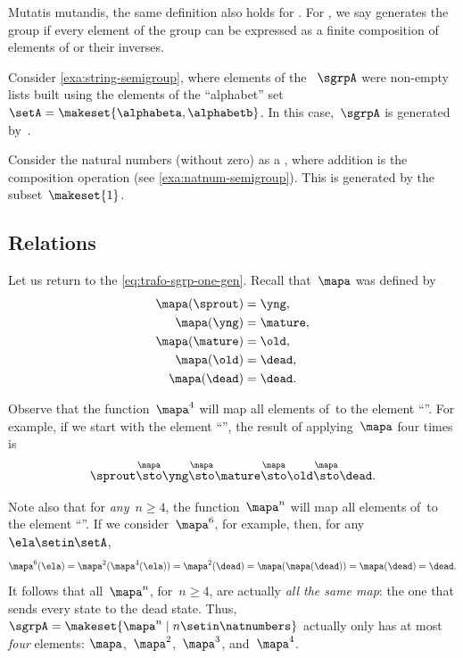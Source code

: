 \begin{remark}
    Mutatis mutandis, the same definition also holds for .
    For , we say \setA generates the group if every element of the group can be expressed as a finite composition of elements of \setA or their inverses.
\end{remark}

\begin{example}
    Consider \cref{exa:string-semigroup}, where elements of the ~$\sgrpA$ were non-empty lists built using the elements of the ``alphabet'' set~$\setA = \makeset{ \alphabeta, \alphabetb}$.
    In this case,~$\sgrpA$ is generated by~\setA.
\end{example}

\begin{example}
    Consider the natural numbers (without zero) as a , where addition is the  composition operation (see \cref{exa:natnum-semigroup}).
    This  is generated by the subset~$\makeset{1 }$.
\end{example}

\subsection{Relations}

Let us return to the  \cref{eq:trafo-sgrp-one-gen}.
Recall that~$\mapa$ was defined by
%
\begin{align}
    \mapa(\sprout) & = \yng, \\
    \mapa(\yng)    & = \mature, \\
    \mapa(\mature) & = \old, \\
    \mapa( \old)   & = \dead, \\
    \mapa(\dead)   & = \dead.
\end{align}

Observe that the function~$\mapa^4$ will map all elements of~\setA to the element ``\dead''.
For example, if we start with the element ``\sprout'', the result of applying~$\mapa$ four times is
%
\begin{equation}
    \sprout \overset{\mapa}{\sto} \yng \overset{\mapa}{\sto} \mature \overset{\mapa}{\sto} \old \overset{\mapa}{\sto} \dead.
\end{equation}

Note also that for \emph{any}~$n \geq 4$, the function~$\mapa^n$ will map all elements of~\setA to the element ``\dead''.
If we consider~$\mapa^6$, for example, then, for any~$\ela \setin \setA$,
%
\begin{equation}
    \mapa^6(\ela) = \mapa^2(\mapa^4(\ela)) = \mapa^2(\dead) = \mapa(\mapa(\dead)) = \mapa(\dead) = \dead.
\end{equation}
%
It follows that all~$\mapa^n$, for~$n \geq 4$, are actually \emph{all the same map}: the one that sends every state to the dead state.
Thus, ~$\sgrpA = \makeset{ \mapa^n \mid n \setin \natnumbers }$ actually only has at most \emph{four} elements: $\mapa$,~$\mapa^2$,~$\mapa^3$, and~$\mapa^4$.


